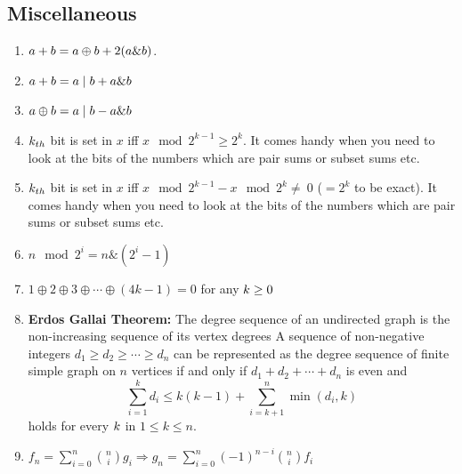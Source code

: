   \subsection{Miscellaneous}
  \begin{enumerate}[resume]
    \item $\displaystyle \displaystyle a+b = a \oplus b +2(a \& b)$.
    \item $\displaystyle \displaystyle a + b = a \mid b + a \& b$
    \item $\displaystyle \displaystyle a \oplus b = a\mid b - a \& b$
    \item $\displaystyle \displaystyle k_{th}$ bit is set in $\displaystyle x$ iff $\displaystyle x \mod 2^{k - 1}\geq 2^k$. It comes handy when you need to look at the bits of the numbers which are pair sums or subset sums etc.
    \item $\displaystyle \displaystyle k_{th}$ bit is set in $\displaystyle x$ iff $\displaystyle x \mod 2^{k - 1} - x \mod 2^k \neq\ 0$ ($ = 2^k$ to be exact). It comes handy when you need to look at the bits of the numbers which are pair sums or subset sums etc.
    \item $n \mod 2^i = n \& (2^i - 1)$
    \item $\displaystyle 1\oplus 2 \oplus 3 \oplus \cdots \oplus (4k - 1) = 0$ for any $\displaystyle \displaystyle k \ge 0$
    \item \textbf{Erdos Gallai Theorem:}
    The degree sequence of an undirected graph is the non-increasing sequence of its vertex degrees
    A sequence of non-negative integers $d_1 \geq d_2 \geq \cdots \geq d_n$ can be represented as the degree sequence of finite simple graph on $n$ vertices if and only if $d_1 + d_2 + \cdots + d_n$ is even and
    \[\displaystyle \sum_{i = 1}^k {d_i \leq k(k - 1)} + \sum_{i = k + 1}^n \min(d_i, k)\]
    holds for every $\displaystyle \displaystyle k$ in $\displaystyle 1 \leq k \leq n$.
    \item $f_n = \sum_{i=0}^{n} \binom{n}{i} g_i \Rightarrow g_n = \sum_{i=0}^{n} (-1)^{n-i} \binom{n}{i} f_i$
\end{enumerate}
